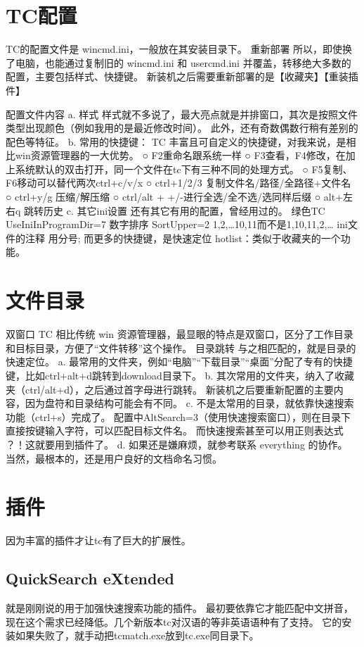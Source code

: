 \documentclass[UTF8,AutoFakeBold,zihao=-4,scheme=chinese]{ctexart}
\begin{document}
\section{TC配置}
TC的配置文件是 wincmd.ini，一般放在其安装目录下。
重新部署
所以，即使换了电脑，也能通过复制旧的 wincmd.ini 和 usercmd.ini 并覆盖，转移绝大多数的配置，主要包括样式、快捷键。
新装机之后需要重新部署的是【收藏夹】【重装插件】

配置文件内容
a. 样式
样式就不多说了，最大亮点就是并排窗口，其次是按照文件类型出现颜色（例如我用的是最近修改时间）。
此外，还有奇数偶数行稍有差别的配色等特征。
b. 常用的快捷键：
TC 丰富且可自定义的快捷键，对我来说，是相比win资源管理器的一大优势。
○ F2重命名跟系统一样
○ F3查看，F4修改，在加上系统默认的双击打开，同一个文件在tc下有三种不同的处理方式。
○ F5复制、F6移动可以替代两次ctrl+c/v/x
○ ctrl+1/2/3 复制文件名/路径/全路径+文件名
○ ctrl+y/g 压缩/解压缩
○ ctrl/alt + +/-进行全选/全不选/选同样后缀
○ alt+左右q 跳转历史
c. 其它ini设置
还有其它有用的配置，曾经用过的。
绿色TC	UseIniInProgramDir=7
数字排序	SortUpper=2 	1,2,…10,11而不是1,10,11,2,…
ini文件的注释	用分号;
而更多的快捷键，是快速定位 hotlist：类似于收藏夹的一个功能。

\section{文件目录}
双窗口
TC 相比传统 win 资源管理器，最显眼的特点是双窗口，区分了工作目录和目标目录，方便了“文件转移”这个操作。
目录跳转
与之相匹配的，就是目录的快速定位。
a. 最常用的文件夹，例如“电脑”“下载目录”“桌面”分配了专有的快捷键，比如ctrl+alt+d跳转到download目录下。
b. 其次常用的文件夹，纳入了收藏夹（ctrl/alt+d），之后通过首字母进行跳转。
新装机之后要重新配置的主要内容，因为盘符和目录结构可能会有不同。
c. 不是太常用的目录，就依靠快速搜索功能（ctrl+s）完成了。
配置中AltSearch=3（使用快速搜索窗口），则在目录下直接按键输入字符，可以匹配目标文件名。
而快速搜索甚至可以用正则表达式 ？！这就要用到插件了。
d. 如果还是嫌麻烦，就参考联系 everything 的协作。
当然，最根本的，还是用户良好的文档命名习惯。

\section{插件}
因为丰富的插件才让tc有了巨大的扩展性。

\subsection{QuickSearch eXtended}
就是刚刚说的用于加强快速搜索功能的插件。
最初要依靠它才能匹配中文拼音，现在这个需求已经降低。几个新版本tc对汉语的等非英语语种有了支持。
它的安装如果失败了，就手动把tcmatch.exe放到tc.exe同目录下。
\end{document}
